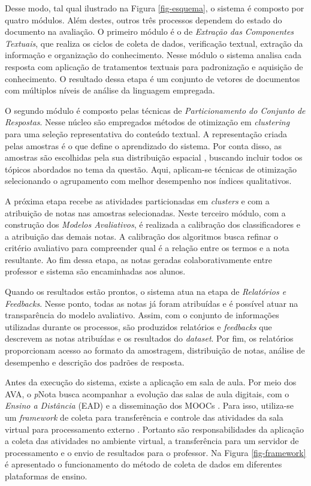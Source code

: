 Desse modo, tal qual ilustrado na Figura \ref{fig-esquema}, o sistema é composto por quatro módulos. Além destes, outros três processos dependem do estado do documento na avaliação. O primeiro módulo é o de \textit{Extração das Componentes Textuais}, que realiza os ciclos de coleta de dados, verificação textual, extração da informação e organização do conhecimento. Nesse módulo o sistema analisa cada resposta com aplicação de tratamentos textuais para padronização e aquisição de conhecimento. O resultado dessa etapa é um conjunto de vetores de documentos com múltiplos níveis de análise da linguagem empregada.

O segundo módulo é composto pelas técnicas de \textit{Particionamento do Conjunto de Respostas}. Nesse núcleo são empregados métodos de otimização em \textit{clustering} para uma seleção representativa do conteúdo textual. A representação criada pelas amostras é o que define o aprendizado do sistema. Por conta disso, as amostras são escolhidas pela sua distribuição espacial \cite{salton1975, baeza2011}, buscando incluir todos os tópicos abordados no tema da questão. Aqui, aplicam-se técnicas de otimização selecionando o agrupamento com melhor desempenho nos índices qualitativos. 

A próxima etapa recebe as atividades particionadas em \textit{clusters} e com a atribuição de notas nas amostras selecionadas. Neste terceiro módulo, com a construção dos \textit{Modelos Avaliativos}, é realizada a calibração dos classificadores e a atribuição das demais notas. A calibração dos algoritmos busca refinar o critério avaliativo para compreender qual é a relação entre os termos e a nota resultante. Ao fim dessa etapa, as notas geradas colaborativamente entre professor e sistema são encaminhadas aos alunos.

Quando os resultados estão prontos, o sistema atua na etapa de \textit{Relatórios e Feedbacks}. Nesse ponto, todas as notas já foram atribuídas e é possível atuar na transparência do modelo avaliativo. Assim, com o conjunto de informações utilizadas durante os processos, são produzidos relatórios e \textit{feedbacks} que descrevem as notas atribuídas e os resultados do \textit{dataset}. Por fim, os relatórios proporcionam acesso ao formato da amostragem, distribuição de notas, análise de desempenho e descrição dos padrões de resposta. 

Antes da execução do sistema, existe a aplicação em sala de aula. Por meio dos AVA, o \textit{p}Nota busca acompanhar a evolução das salas de aula digitais, com o \textit{Ensino a Distância} (EAD) e a disseminação dos MOOCs \cite{mohapatra2017}. Para isso, utiliza-se um \textit{framework} de coleta para transferência e controle das atividades da sala virtual para processamento externo \cite{spalenza2018}. Portanto são responsabilidades da aplicação a coleta das atividades no ambiente virtual, a transferência para um servidor de processamento e o envio de resultados para o professor. Na Figura \ref{fig-framework} é apresentado o funcionamento do método de coleta de dados em diferentes plataformas de ensino.


